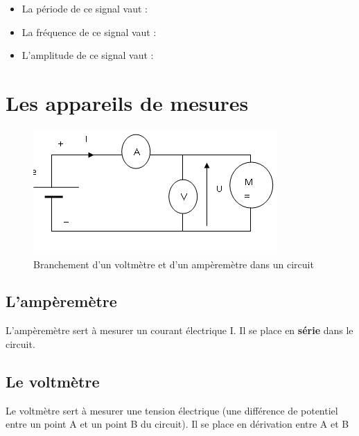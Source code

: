 \documentclass[10pt,fleqn]{article} %
\begin{document}
    \begin{itemize}
        \item La période de ce signal vaut : 
        \item La fréquence de ce signal vaut : 
        \item  L'amplitude de ce signal vaut : 
    \end{itemize}
    \pagebreak
    \section{Les appareils de mesures}
    \begin{figure}[h]
        \centering
        \includegraphics[height=0.2\textheight]{images/branchement.png}
        \caption{Branchement d'un voltmètre et d'un ampèremètre dans un circuit}
        \label{fig:branchement}
    \end{figure}
    
    \subsection{L'ampèremètre}
    L'ampèremètre sert à mesurer un courant électrique I. Il se place en \textbf{série} dans le circuit. 
    
    \subsection{Le voltmètre}
    Le voltmètre sert à mesurer une tension électrique (une différence de potentiel entre un point A et un point B du circuit). Il se place en dérivation entre A et B
\end{document}
